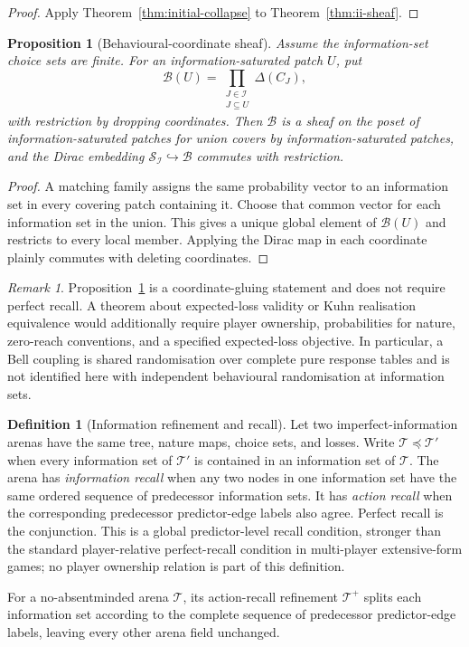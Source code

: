 \documentclass[11pt]{article}
\theoremstyle{plain}
\newtheorem{proposition}[theorem]{Proposition}
\theoremstyle{definition}
\newtheorem{definition}[theorem]{Definition}
\theoremstyle{remark}
\newtheorem{remark}[theorem]{Remark}
\begin{document}
\begin{proof}
Apply Theorem~\ref{thm:initial-collapse} to
Theorem~\ref{thm:ii-sheaf}.
\end{proof}

\begin{proposition}[Behavioural-coordinate sheaf]
\label{prop:behavioural-sheaf}
Assume the information-set choice sets are finite. For an
information-saturated patch $U$, put
\[
\mathscr B(U)=
\prod_{\substack{J\in\mathcal I\\J\subseteq U}}\Delta(C_J),
\]
with restriction by dropping coordinates. Then $\mathscr B$ is a sheaf on the poset of information-saturated patches
for union covers by information-saturated patches, and the Dirac embedding
$\mathscr S_{\mathcal I}\hookrightarrow\mathscr B$ commutes with restriction.
\end{proposition}

\begin{proof}
A matching family assigns the same probability vector to an information set in
every covering patch containing it. Choose that common vector for each
information set in the union. This gives a unique global element of
$\mathscr B(U)$ and restricts to every local member. Applying the Dirac map in
each coordinate plainly commutes with deleting coordinates.
\end{proof}

\begin{remark}
Proposition~\ref{prop:behavioural-sheaf} is a coordinate-gluing statement and
does not require perfect recall. A theorem about expected-loss validity or
Kuhn realisation equivalence would additionally require player ownership,
probabilities for nature, zero-reach conventions, and a specified expected-loss
objective. In particular, a Bell coupling is shared randomisation over complete
pure response tables and is not identified here with independent behavioural
randomisation at information sets.
\end{remark}


\begin{definition}[Information refinement and recall]
\label{def:information-refinement}
Let two imperfect-information arenas have the same tree, nature maps, choice
sets, and losses. Write $\mathcal T\preceq\mathcal T'$ when every information
set of $\mathcal T'$ is contained in an information set of $\mathcal T$.
The arena has \emph{information recall} when any two nodes in one information
set have the same ordered sequence of predecessor information sets. It has
\emph{action recall} when the corresponding predecessor predictor-edge labels
also agree. Perfect recall is the conjunction. This is a global predictor-level recall
condition, stronger than the standard player-relative perfect-recall condition
in multi-player extensive-form games; no player ownership relation is part of
this definition.

For a no-absentminded arena $\mathcal T$, its action-recall refinement
$\mathcal T^+$ splits each information set according to the complete sequence
of predecessor predictor-edge labels, leaving every other arena field
unchanged.
\end{definition}
\end{document}
